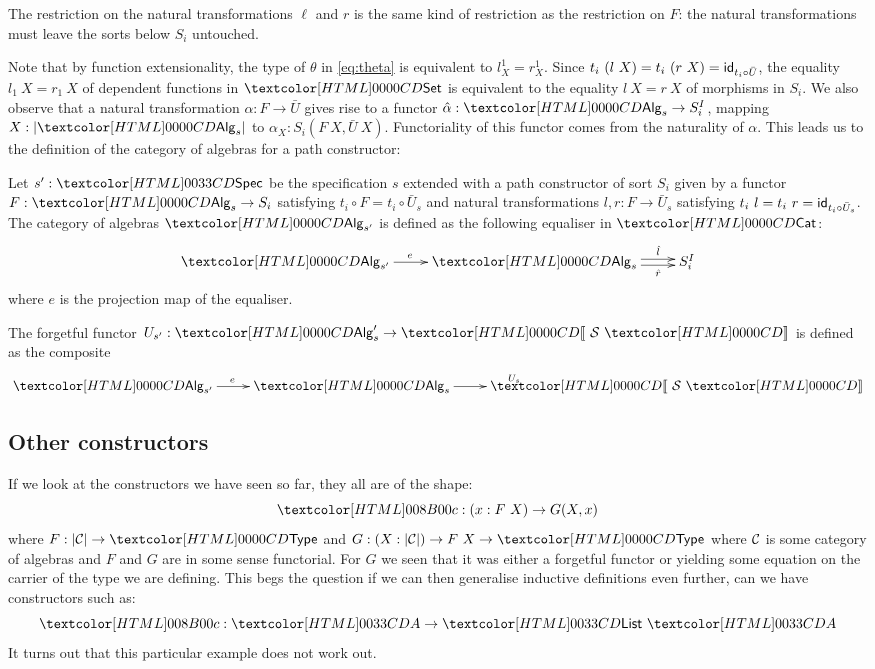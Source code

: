 The restriction on the natural transformations $\ell$ and $r$ is the
same kind of restriction as the restriction on $F$: the natural
transformations must leave the sorts below $S_i$ untouched.

Note that by function extensionality, the type of $\theta$ in
\eqref{eq:theta} is equivalent to $l^1_X = r^1_X$. Since
$t_i\ (l\ X) = t_i\ (r\ X) = \mathsf{id}_{t_i \circ
  \bar{U}}$, %
the equality $l_1\ X = r_1\ X$ of dependent functions in
$\Set$ is equivalent to the equality $l\ X = r\ X
$ of morphisms in
$S_i$. We also observe that a natural transformation $\alpha : F \to
\bar{U}$ gives rise to a functor $\hat{\alpha} : \Alg_s \to
S_i^I$, mapping $X : | \Alg_s |$ to $\alpha_X : S_i(F\ X,\bar{U}\
X)$. Functoriality of this functor comes from the naturality of
$\alpha$. This leads us to the definition of the category of algebras
for a path constructor:

\begin{definition}
  Let $s' : \specty$ be the specification
  $s$ extended with a path constructor of sort
  $S_i$ given by a functor $F : \Alg_s \to S_i$ satisfying $t_i \circ
  F = t_i \circ \bar{U}_s$ and natural transformations $l, r : F \to
  \bar{U}_s$ satisfying $t_i\ l = t_i\ r = \mathsf{id}_{t_i \circ
    \bar{U}_s}$. The category of algebras
  $\Alg_{s'}$ is defined as the following equaliser in $\Cat$:
  \[
  \xymatrix{
    \Alg_{s'} \ar[r]^{e} &\Alg_s \ar@<-.5ex>[r]_-{\hat{r}} \ar@<.5ex>[r]^-{\hat{l}} &S_i^I
  }
  \]
  where $e$ is the projection map of the equaliser.

The forgetful functor $U_{s'} : \Alg_s' \to \SortCat{\Ss}$ is defined as the composite
\[
\xymatrix{
    \Alg_{s'} \ar[r]^{e} &\Alg_s \ar[r]^{U_s} &\SortCat{\Ss}
}
\]
\end{definition}

\subsection{Other constructors}

If we look at the constructors we have seen so far, they all are of
the shape:
$$
\Ac : (x : F\ X) \to G (X , x)
$$
where $F : | \Cc | \to \Type$ and
$G : (X : | \Cc |) \to F\ X \to \Type$ where $\mathcal{C}$ is some category of
algebras and $F$ and $G$ are in some sense functorial. For $G$ we seen
that it was either a forgetful functor or yielding some equation on
the carrier of the type we are defining. This begs the question if we
can then generalise inductive definitions even further, \ie can we
have constructors such as:
$$
\Ac : \Aty \to \List\ \Aty
$$
It turns out that this particular example does not work out.


